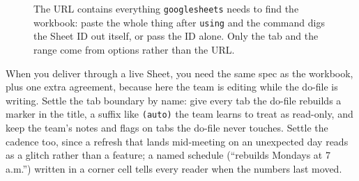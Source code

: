\begin{figure}[htbp]
\centering
{}
\caption[Anatomy of a Google Sheets URL]{The URL contains everything \texttt{googlesheets} needs to find the workbook: paste the whole thing after \texttt{using} and the command digs the Sheet ID out itself, or pass the ID alone. Only the tab and the range come from options rather than the URL.}
\label{fig:ch11-viz-sheeturl}
\end{figure}

When you deliver through a live Sheet, you need the same spec as the workbook, plus one extra agreement, because here the team is editing while the do-file is writing. Settle the tab boundary by name: give every tab the do-file rebuilds a marker in the title, a suffix like \texttt{(auto)} the team learns to treat as read-only, and keep the team's notes and flags on tabs the do-file never touches. Settle the cadence too, since a refresh that lands mid-meeting on an unexpected day reads as a glitch rather than a feature; a named schedule (\enquote{rebuilds Mondays at 7 a.m.}) written in a corner cell tells every reader when the numbers last moved.

